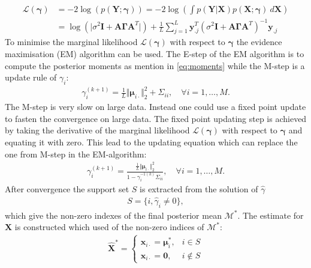 \begin{align*}
\mathcal{L}(\boldsymbol{\gamma}) &= - 2 \log(p (\mathbf{Y} ; \boldsymbol{\gamma})) = -2 \log \left( \int p (\mathbf{Y}  \vert \mathbf{X}) p (\mathbf{X} ; \boldsymbol{\gamma}) \ d\mathbf{X} \right) \\
&= \log ( \vert \sigma^2 \mathbf{I} + \mathbf{A} \boldsymbol{\Gamma} \mathbf{A}^T \vert) + \frac{1}{L} \sum_{j=1}^L \mathbf{y}_{.j}^T \left( \sigma^2 \mathbf{I} + \mathbf{A} \boldsymbol{\Gamma} \mathbf{A}^T\right)^{-1} \mathbf{y}_{.j}
\end{align*}
To minimise the marginal likelihood $\mathcal{L}(\boldsymbol{\gamma})$ with respect to $\boldsymbol{\gamma}$ the evidence maximisation (EM) algorithm can be used. The E-step of the EM algorithm is to compute the posterior moments as mention in \eqref{eq:moments} while the M-step is a update rule of $\gamma_i$:
\begin{align*}
\gamma_i^{(k+1)} = \frac{1}{L} \Vert \boldsymbol{\mu}_{i \cdot} \Vert_2^2 + \Sigma_{ii}, \quad \forall i = 1, \dots, M.
\end{align*}
The M-step is very slow on large data. Instead one could use a fixed point update to fasten the convergence on large data. The fixed point updating step is achieved by taking the derivative of the marginal likelihood $\mathcal{L}(\boldsymbol{\gamma})$ with respect to $\boldsymbol{\gamma}$ and equating it with zero. This lead to the updating equation which can replace the one from M-step in the EM-algorithm:
\begin{align*}
\gamma_i^{(k+1)} = \frac{\frac{1}{L} \Vert \boldsymbol{\mu}_{i \cdot} \Vert_2^2}{1 - \gamma_i^{-1 (k)} \Sigma_{ii}}, \quad \forall i = 1, \dots, M.
\end{align*}
After convergence the support set $S$ is extracted from the solution of $\hat{\gamma}$
\begin{align*}
S = \{ i, \hat{\gamma}_i \neq 0 \},
\end{align*}
which give the non-zero indexes of the final posterior mean $\mathcal{M}^\ast$. The estimate for $\mathbf{X}$ is constructed which used of the non-zero indices of $\mathcal{M}^\ast$:
\begin{align*}
\hat{\mathbf{X}}^\ast = 
\begin{cases}
\mathbf{x}_{i\cdot} = \boldsymbol{\mu}_i^\ast, & i \in S \\
\mathbf{x}_{i\cdot} = \mathbf{0}, & i \not \in S
\end{cases}
\end{align*}


